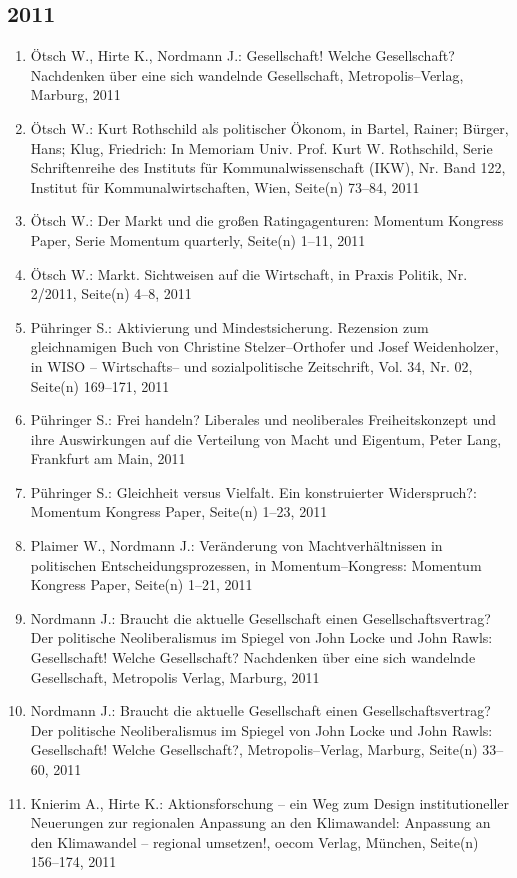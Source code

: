 \subsection*{2011}
\begin{enumerate}
    	 \item Ötsch W., Hirte K., Nordmann J.: Gesellschaft! Welche Gesellschaft? Nachdenken über eine sich wandelnde Gesellschaft, Metropolis--Verlag, Marburg, 2011
	 \item Ötsch W.: Kurt Rothschild als politischer Ökonom, in Bartel, Rainer; Bürger, Hans; Klug, Friedrich: In Memoriam Univ. Prof. Kurt W. Rothschild, Serie Schriftenreihe des Instituts für Kommunalwissenschaft (IKW), Nr. Band 122, Institut für Kommunalwirtschaften, Wien, Seite(n) 73--84, 2011
	 \item Ötsch W.: Der Markt und die großen Ratingagenturen: Momentum Kongress Paper, Serie Momentum quarterly, Seite(n) 1--11, 2011
	 \item Ötsch W.: Markt. Sichtweisen auf die Wirtschaft, in Praxis Politik, Nr. 2/2011, Seite(n) 4--8, 2011
	 \item Pühringer S.: Aktivierung und Mindestsicherung. Rezension zum gleichnamigen Buch von Christine Stelzer--Orthofer und Josef Weidenholzer, in WISO -- Wirtschafts-- und sozialpolitische Zeitschrift, Vol. 34, Nr. 02, Seite(n) 169--171, 2011
	 \item Pühringer S.: Frei handeln? Liberales und neoliberales Freiheitskonzept und ihre Auswirkungen auf die Verteilung von Macht und Eigentum, Peter Lang, Frankfurt am Main, 2011
	 \item Pühringer S.: Gleichheit versus Vielfalt. Ein konstruierter Widerspruch?: Momentum Kongress Paper, Seite(n) 1--23, 2011
	 \item Plaimer W., Nordmann J.: Veränderung von Machtverhältnissen in politischen Entscheidungsprozessen, in Momentum--Kongress: Momentum Kongress Paper, Seite(n) 1--21, 2011
	 \item Nordmann J.: Braucht die aktuelle Gesellschaft einen Gesellschaftsvertrag? Der politische Neoliberalismus im Spiegel von John Locke und John Rawls: Gesellschaft! Welche Gesellschaft? Nachdenken über eine sich wandelnde Gesellschaft, Metropolis Verlag, Marburg, 2011
	 \item Nordmann J.: Braucht die aktuelle Gesellschaft einen Gesellschaftsvertrag? Der politische Neoliberalismus im Spiegel von John Locke und John Rawls: Gesellschaft! Welche Gesellschaft?, Metropolis--Verlag, Marburg, Seite(n) 33--60, 2011
	 \item Knierim A., Hirte K.: Aktionsforschung -- ein Weg zum Design institutioneller Neuerungen zur regionalen Anpassung an den Klimawandel: Anpassung an den Klimawandel -- regional umsetzen!, oecom Verlag, München, Seite(n) 156--174, 2011

\end{enumerate}
